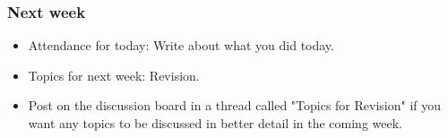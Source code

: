 \documentclass{beamer}
\begin{document}
\begin{frame}
\frametitle{Next week}
\begin{itemize}
\item Attendance for today: Write about what you did today.
\item Topics for next week: Revision. 
\item Post on the discussion board in a thread called "Topics for Revision" if you want any topics to be discussed in better detail in the coming week.
\end{itemize}
\end{frame}
\end{document}
